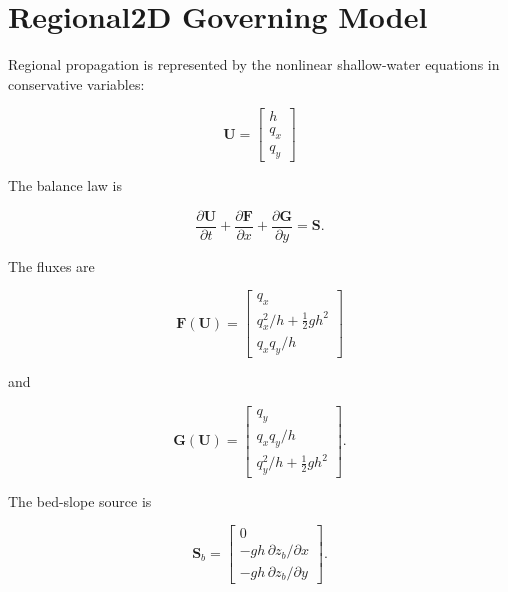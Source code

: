 \section{Regional2D Governing Model}

Regional propagation is represented by the nonlinear shallow-water equations in conservative variables:

\begin{equation}
\label{eq:regional-conserved-state}
\mathbf U=
\begin{bmatrix}
h\\
q_x\\
q_y
\end{bmatrix}
\end{equation}

The balance law is

\begin{equation}
\label{eq:nlswe-balance-law}
\frac{\partial\mathbf U}{\partial t}
+
\frac{\partial\mathbf F}{\partial x}
+
\frac{\partial\mathbf G}{\partial y}
=
\mathbf S .
\end{equation}

The fluxes are

\begin{equation}
\label{eq:nlswe-flux-x}
\mathbf F(\mathbf U)=
\begin{bmatrix}
q_x\\
q_x^2/h+\frac{1}{2}gh^2\\
q_xq_y/h
\end{bmatrix}
\end{equation}

and

\begin{equation}
\label{eq:nlswe-flux-y}
\mathbf G(\mathbf U)=
\begin{bmatrix}
q_y\\
q_xq_y/h\\
q_y^2/h+\frac{1}{2}gh^2
\end{bmatrix}.
\end{equation}

The bed-slope source is

\begin{equation}
\label{eq:bed-slope-source}
\mathbf S_b=
\begin{bmatrix}
0\\
-gh\,\partial z_b/\partial x\\
-gh\,\partial z_b/\partial y
\end{bmatrix}.
\end{equation}

